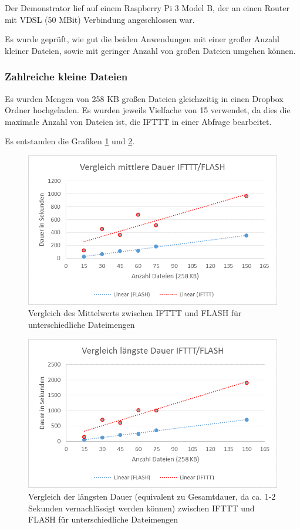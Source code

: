 Der Demonstrator lief auf einem Raspberry Pi 3 Model B, der an einen Router mit VDSL (50 MBit) Verbindung angeschlossen war.

Es wurde geprüft, wie gut die beiden Anwendungen mit einer großer Anzahl kleiner Dateien, sowie mit geringer Anzahl von großen Dateien umgehen können. 

\subsubsection{Zahlreiche kleine Dateien}
Es wurden Mengen von 258 KB großen Dateien gleichzeitig in einen Dropbox Ordner hochgeladen. Es wurden jeweils Vielfache von 15 verwendet, da dies die maximale Anzahl von Dateien ist, die IFTTT in einer Abfrage bearbeitet.

Es entstanden die Grafiken \ref{fig:eval1} und \ref{fig:eval2}.
\begin{figure}
	\centering
	\includegraphics[width=\textwidth]{bilder/vs_mittelwert}
	\caption{Vergleich des Mittelwerts zwischen IFTTT und FLASH für unterschiedliche Dateimengen}
	\label{fig:eval1}
\end{figure}

\begin{figure}
	\centering
	\includegraphics[width=\textwidth]{bilder/vs_laengste}
	\caption{Vergleich der längsten Dauer (equivalent zu Gesamtdauer, da ca. 1-2 Sekunden vernachlässigt werden können) zwischen IFTTT und FLASH für unterschiedliche Dateimengen}
	\label{fig:eval2}
\end{figure}

